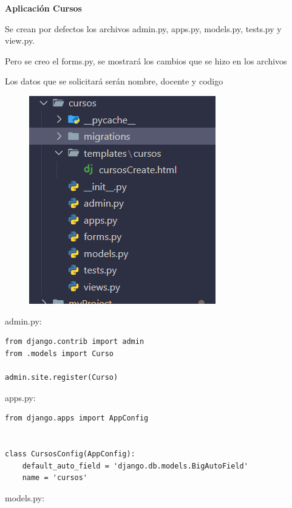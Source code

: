 \documentclass{article}
\begin{document}
     
\textbf{\large Aplicación Cursos}
 \item    Se crean por defectos los archivos admin.py, apps.py, models.py, tests.py y view.py. 
 \item    Pero se creo el forms.py, se mostrará los cambios que se hizo en los archivos
  \item  Los datos que se solicitará serán nombre, docente y codigo
 
    \begin{figure}[H]
           \centering
           \includegraphics[scale=0.6]{latex/img/img8.png}
     \end{figure}

\item admin.py:
 
\begin{lstlisting}
from django.contrib import admin
from .models import Curso

admin.site.register(Curso)

\end{lstlisting}

\item apps.py:
 
\begin{lstlisting}
from django.apps import AppConfig


class CursosConfig(AppConfig):
    default_auto_field = 'django.db.models.BigAutoField'
    name = 'cursos'
\end{lstlisting}

\item models.py:
 
\end{document}
